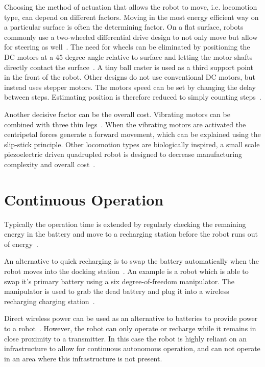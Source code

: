 Choosing the method of actuation that allows the robot to move, i.e. locomotion type, can depend on different factors.
Moving in the most energy efficient way on a particular surface is often the determining factor.
On a flat surface, robots commonly use a two-wheeled differential drive design to not only move but allow for steering as well~\cite{sabelhaus_icra_2013, pickem_icra_2015}.
The need for wheels can be eliminated by positioning the DC motors at a 45 degree angle relative to surface and letting the motor shafts directly contact the surface~\cite{kim_iros_2016}.
A tiny ball caster is used as a third support point in the front of the robot.
Other designs do not use conventional DC motors, but instead uses stepper motors.
The motors speed can be set by changing the delay between steps. 
Estimating position is therefore reduced to simply counting steps~\cite{pickem_icra_2015}.

Another decisive factor can be the overall cost.
Vibrating motors can be combined with three thin legs~\cite{rubenstein_icra_2012}.
When the vibrating motors are activated the centripetal forces generate a forward movement, which can be explained using the slip-stick principle.
Other locomotion types are biologically inspired, a small scale piezoelectric driven quadrupled robot is designed to decrease manufacturing complexity and overall cost~\cite{baisch_iros_2013}.

\section{Continuous Operation}
\label{sec:rw_continous_operation}

Typically the operation time is extended by regularly checking the remaining energy in the battery and move to a recharging station before the robot runs out of energy~\cite{pickem_icra_2015, rubenstein_icra_2012}.

An alternative to quick recharging is to swap the battery automatically when the robot moves into the docking station~\cite{kemal_mech_2015}.
An example is a robot which is able to swap it's primary battery using a six degree-of-freedom manipulator.
The manipulator is used to grab the dead battery and plug it into a wireless recharging charging station~\cite{zhang_conel_2013}.

Direct wireless power can be used as an alternative to batteries to provide power to a robot~\cite{karpelson_icra_2014}.
However, the robot can only operate or recharge while it remains in close proximity to a transmitter. 
In this case the robot is highly reliant on an infrastructure to allow for continuous autonomous operation, and can not operate in an area where this infrastructure is not present.
 

